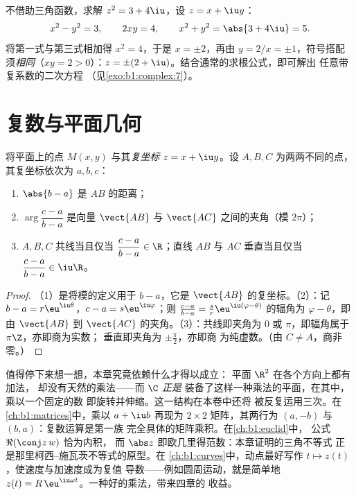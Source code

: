 \begin{example}[代数形式的平方根]\label{ex:b1:complex:sqrt}
不借助三角函数，求解 $z^2 = 3 + 4\iu$，设 $z = x + \iu y$：
\[
x^2 - y^2 = 3, \qquad 2xy = 4, \qquad x^2 + y^2 = \abs{3 + 4\iu} = 5 .
\]
将第一式与第三式相加得 $x^2 = 4$，于是 $x = \pm 2$，再由 $y = 2/x =
\pm 1$，符号搭配须\emph{相同}（$xy = 2 > 0$）：$z = \pm(2 +
\iu)$。结合通常的求根公式，即可解出
任意带复系数的二次方程
（见\cref{exo:b1:complex:7}）。
\end{example}

\section{复数与平面几何}

\begin{proposition}[几何对照]\label{prop:b1:complex:geometry}
将平面上的点 $M(x, y)$ 与其\emph{复坐标} $z = x
+ \iu y$。设 $A, B, C$ 为两两不同的点，其复坐标依次为 $a, b,
c$：
\begin{enumerate}
  \item $\abs{b - a}$ 是 $AB$ 的距离；
  \item $\arg\dfrac{c - a}{b - a}$ 是向量
        $\vect{AB}$ 与 $\vect{AC}$ 之间的夹角（模 $2\pi$）；
  \item $A, B, C$ 共线当且仅当 $\dfrac{c - a}{b - a} \in
        \R$；直线 $AB$ 与 $AC$ 垂直当且仅当
        $\dfrac{c - a}{b - a} \in \iu\R$。
\end{enumerate}
\end{proposition}

\begin{proof}
（1）是将模的定义用于 $b - a$，它是
$\vect{AB}$ 的复坐标。（2）：记 $b - a = r\eu^{\iu\theta}$，$c - a =
s\eu^{\iu\varphi}$；则 $\frac{c-a}{b-a} = \frac sr
\eu^{\iu(\varphi - \theta)}$ 的辐角为 $\varphi - \theta$，即
由 $\vect{AB}$ 到 $\vect{AC}$ 的夹角。（3）：共线即夹角为 $0$
或 $\pi$，即辐角属于 $\pi\Z$，亦即商为实数；
垂直即夹角为 $\pm\frac\pi2$，亦即商
为纯虚数。（由 $C \neq A$，商非零。）
\end{proof}

\begin{remark}[插曲：$\C$ 是赋予了乘法的平面]\label{rem:b1:complex:interlude}
值得停下来想一想，本章究竟依赖什么才得以成立：
平面 $\R^2$ 在各个方向上都有加法，
却没有天然的乘法——而 $\C$ \emph{正是}
装备了这样一种乘法的平面，在其中，乘以一个固定的数
即旋转并伸缩。这一结构在本卷中还将
被反复运用三次。在\cref{ch:b1:matrices}中，乘以
$a + \iu b$ 再现为 $2 \times 2$ 矩阵，其两行为 $(a,
-b)$ 与 $(b, a)$：复数运算是第一族
完全具体的矩阵乘积。在\cref{ch:b1:euclid}中，
公式 $\Re(\conj z\,w)$ 恰为内积，
而 $\abs z$ 即欧几里得范数：本章证明的三角不等式
正是那里柯西–施瓦茨不等式的原型。在
\cref{ch:b1:curves}中，动点最好写作 $t \mapsto
z(t)$，使速度与加速度成为复值
导数——例如圆周运动，就是简单地 $z(t) =
R\,\eu^{\iu\omega t}$。一种好的乘法，带来四章的
收益。
\end{remark}

